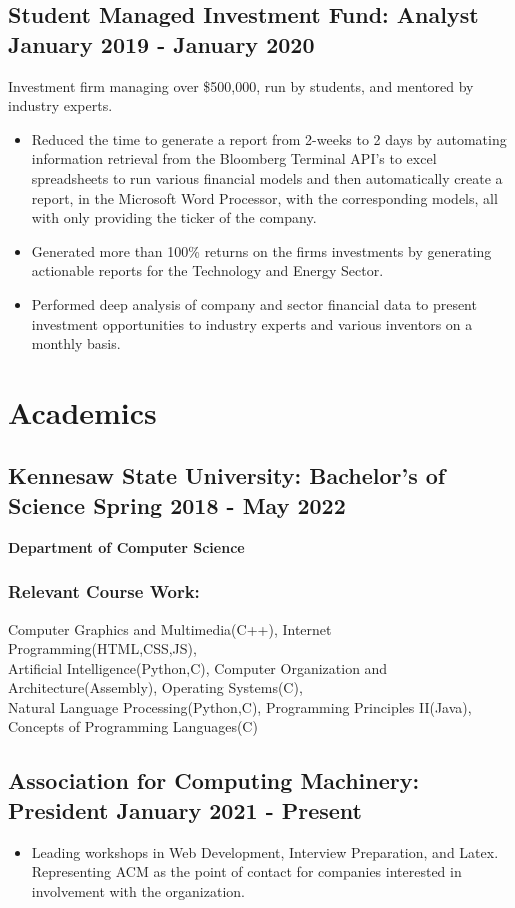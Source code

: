 \documentclass{article}
\begin{document}
\subsection{\large Student Managed Investment Fund: Analyst \hfill \small January 2019 - January 2020}
Investment firm managing over \$500,000, run by students, and mentored by industry experts.
\begin{itemize}
\setlength\itemsep{.1em}
	\item Reduced the time to generate a report from 2-weeks to 2 days by automating information retrieval from the Bloomberg Terminal API's to excel spreadsheets to run various financial models and then automatically create a report, in the Microsoft Word Processor, with the corresponding models, all with only providing the ticker of the company. 
	\item Generated more than 100\% returns on the firms investments by generating actionable reports for the Technology and Energy Sector.
	\item Performed deep analysis of company and sector financial data to present investment opportunities to industry experts and various inventors on a monthly basis. 
\end{itemize}
\section{Academics}
\subsection{\large Kennesaw State University: Bachelor's of Science  \hfill \small Spring 2018 - May 2022}
\textbf{Department of Computer Science}
\subsubsection{Relevant Course Work:} Computer Graphics and Multimedia(C++), Internet Programming(HTML,CSS,JS),\\Artificial Intelligence(Python,C), Computer Organization and Architecture(Assembly), Operating Systems(C), \\Natural Language Processing(Python,C), Programming Principles II(Java), Concepts of Programming Languages(C)
\subsection{\large Association for Computing Machinery: President \hfill \small January 2021 - Present}
\begin{itemize}
\setlength\itemsep{.1em}
	\item  Leading workshops in Web Development, Interview Preparation, and Latex.  Representing ACM as the point of contact for companies interested in involvement with the organization. 
\end{itemize}
\end{document}
